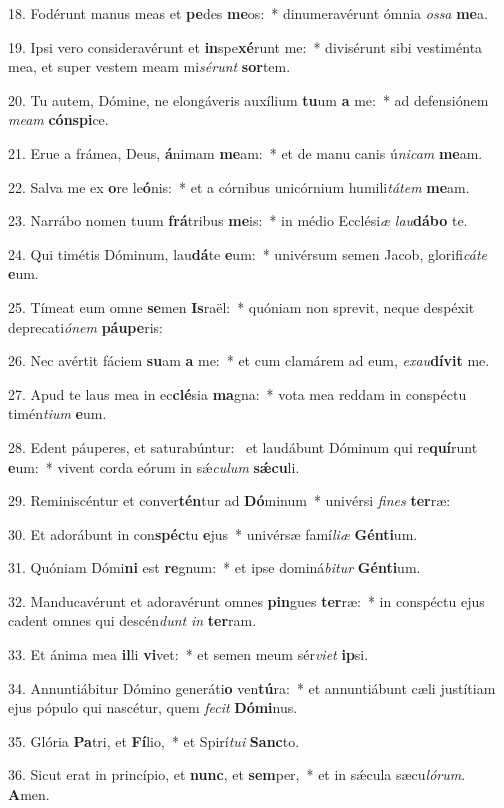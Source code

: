 18. Fodérunt manus meas et \textbf{pe}des \textbf{me}os:~*  dinumeravérunt ómnia \textit{os}\textit{sa} \textbf{me}a.\

19. Ipsi vero consideravérunt et \textbf{in}spe\textbf{xé}runt me:~*  divisérunt sibi vestiménta mea, et super vestem meam mi\textit{sé}\textit{runt} \textbf{sor}tem.\

20. Tu autem, Dómine, ne elongáveris auxílium \textbf{tu}um \textbf{a} me:~*  ad defensiónem \textit{me}\textit{am} \textbf{cón}\textbf{spi}ce.\

21. Erue a frámea, Deus, \textbf{á}nimam \textbf{me}am:~*  et de manu canis ú\textit{ni}\textit{cam} \textbf{me}am.\

22. Salva me ex \textbf{o}re le\textbf{ó}nis:~*  et a córnibus unicórnium humili\textit{tá}\textit{tem} \textbf{me}am.\

23. Narrábo nomen tuum \textbf{frá}tribus \textbf{me}is:~*  in médio Ecclési\textit{æ} \textit{lau}\textbf{dá}\textbf{bo} te.\

24. Qui timétis Dóminum, lau\textbf{dá}te \textbf{e}um:~*  univérsum semen Jacob, glorifi\textit{cá}\textit{te} \textbf{e}um.\

25. Tímeat eum omne \textbf{se}men \textbf{Is}raël:~*  quóniam non sprevit, neque despéxit deprecati\textit{ó}\textit{nem} \textbf{páu}\textbf{pe}ris:\

26. Nec avértit fáciem \textbf{su}am \textbf{a} me:~*  et cum clamárem ad eum, \textit{ex}\textit{au}\textbf{dí}\textbf{vit} me.\

27. Apud te laus mea in ec\textbf{clé}sia \textbf{ma}gna:~*  vota mea reddam in conspéctu timén\textit{ti}\textit{um} \textbf{e}um.\

28. Edent páuperes, et saturabúntur: \dag\  et laudábunt Dóminum qui re\textbf{quí}runt \textbf{e}um:~*  vivent corda eórum in sǽ\textit{cu}\textit{lum} \textbf{sǽ}\textbf{cu}li.\

29. Reminiscéntur et conver\textbf{tén}tur ad \textbf{Dó}minum~*  univérsi \textit{fi}\textit{nes} \textbf{ter}ræ:\

30. Et adorábunt in con\textbf{spéc}tu \textbf{e}jus~*  univérsæ famí\textit{li}\textit{æ} \textbf{Gén}\textbf{ti}um.\

31. Quóniam Dómi\textbf{ni} est \textbf{re}gnum:~*  et ipse dominá\textit{bi}\textit{tur} \textbf{Gén}\textbf{ti}um.\

32. Manducavérunt et adoravérunt omnes \textbf{pin}gues \textbf{ter}ræ:~*  in conspéctu ejus cadent omnes qui descén\textit{dunt} \textit{in} \textbf{ter}ram.\

33. Et ánima mea \textbf{il}li \textbf{vi}vet:~*  et semen meum sér\textit{vi}\textit{et} \textbf{ip}si.\

34. Annuntiábitur Dómino generáti\textbf{o} ven\textbf{tú}ra:~*  et annuntiábunt cæli justítiam ejus pópulo qui nascétur, quem \textit{fe}\textit{cit} \textbf{Dó}\textbf{mi}nus.\

35. Glória \textbf{Pa}tri, et \textbf{Fí}lio,~*  et Spirí\textit{tu}\textit{i} \textbf{Sanc}to.\

36. Sicut erat in princípio, et \textbf{nunc}, et \textbf{sem}per,~*  et in sǽcula sæcu\textit{ló}\textit{rum}. \textbf{A}men.\

